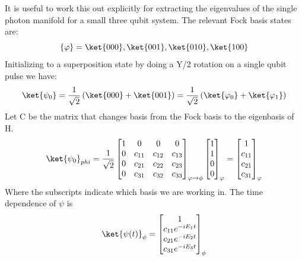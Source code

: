 It is useful to work this out explicitly for extracting the eigenvalues of the single photon manifold for a small three qubit system.  %
The relevant Fock basis states are:
\begin{equation}
    \{\varphi\} = \ket{000}, \ket{001}, \ket{010}, \ket{100}
\end{equation}
Initializing to a superposition state by doing a Y/2 rotation on a single qubit pulse we have:
\begin{equation*}
    \ket{\psi_0} = \frac{1}{\sqrt{2}} \left( \ket{000} + \ket{001} \right) = \frac{1}{\sqrt{2}} \left( \ket{\varphi_0} + \ket{\varphi_1} \right)
\end{equation*}
Let C be the matrix that changes basis from the Fock basis to the eigenbasis of H.
\begin{equation}
    \ket{\psi_0}_{phi} = \frac{1}{\sqrt{2}}
    \begin{bmatrix}
        1 & 0 & 0 & 0 \\
        0 & c_{11} & c_{12} & c_{13} \\
        0 & c_{21} & c_{22} & c_{23} \\
        0 & c_{31} & c_{32} & c_{33} \\
    \end{bmatrix}_{\varphi \rightarrow \phi}
    \begin{bmatrix}
        1 \\
        1 \\
        0 \\
        0 \\
    \end{bmatrix}_{\varphi}
    =
    \begin{bmatrix}
        1 \\
        c_{11} \\
        c_{21} \\
        c_{31} \\
    \end{bmatrix}_{\varphi}
\end{equation}
Where the subscripts indicate which basis we are working in.
The time dependence of $\psi$ is
\begin{equation}
    \ket{\psi(t)}_{\phi} =
    \begin{bmatrix}
        1 \\
        c_{11} e^{-i E_1 t} \\
        c_{21} e^{-i E_2 t} \\
        c_{31} e^{-i E_3 t}\\
    \end{bmatrix}_{\phi}
\end{equation}

